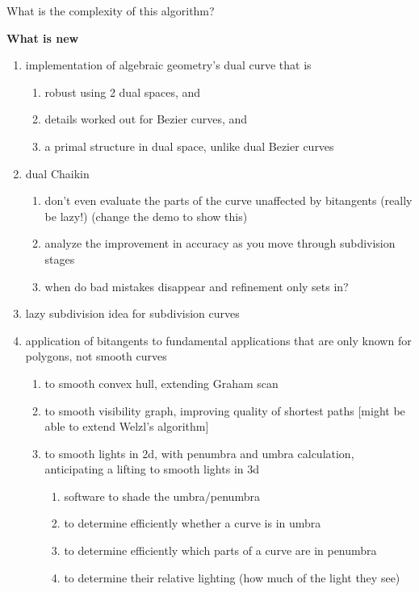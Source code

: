 \documentclass[9pt,twocolumn]{article}
\begin{document}
What is the complexity of this algorithm?


\centerline{{\bf What is new}}
\begin{enumerate}
\item implementation of algebraic geometry's dual curve that is
\begin{enumerate}
\item robust using 2 dual spaces, and
\item details worked out for Bezier curves, and
\item a primal structure in dual space, unlike dual Bezier curves
\end{enumerate}
\item dual Chaikin
\begin{enumerate}
\item 	don't even evaluate the parts of the curve unaffected by bitangents
		(really be lazy!)  (change the demo to show this)
\item 	analyze the improvement in accuracy as you move through subdivision stages
\item 	when do bad mistakes disappear and refinement only sets in?
\end{enumerate}
\item lazy subdivision idea for subdivision curves
\item application of bitangents to fundamental applications that are only known
	for polygons, not smooth curves
\begin{enumerate}
\item to smooth convex hull, extending Graham scan
\item to smooth visibility graph, improving quality of shortest paths
			[might be able to extend Welzl's algorithm]
\item to smooth lights in 2d, with penumbra and umbra calculation,
	     	anticipating a lifting to smooth lights in 3d
\begin{enumerate}
\item   software to shade the umbra/penumbra
\item 	to determine efficiently whether a curve is in umbra
\item 	to determine efficiently which parts of a curve are in penumbra
\item 	to determine their relative lighting (how much of the light they see)
\end{enumerate}
\end{enumerate}
\end{enumerate}
	     
\end{document}
